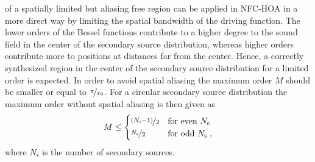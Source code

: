  of a spatially limited but aliasing free region can be applied in
\ac{NFC-HOA} in a more direct way by limiting the spatial bandwidth of the driving
function. The lower orders of the Bessel functions contribute to a higher degree to the sound
field in the center of the secondary source distribution, whereas higher orders
contribute more to positions at distances far from the
center.\autocite[][Sect.\,2.2.2]{Ahrens2012}
Hence, a correctly synthesized region in the center of the
secondary source distribution for a limited order is expected.
In order to avoid spatial aliasing the maximum
order $M$ should be smaller or equal to $\nicefrac{\pi}{x_0}$. For a circular
secondary source distribution the maximum order without spatial aliasing is then
given as
%
\begin{equation}
    M \le
    \begin{cases}
        \nicefrac{(N_\text{s}-1)}{2} & \text{for even } N_\text{s} \\
        \nicefrac{N_\text{s}}{2} & \text{for odd } N_\text{s} \qc
    \end{cases}
    \label{eq:nfchoa_order}
\end{equation}
%
where $N_\text{s}$ is the number of secondary sources.

